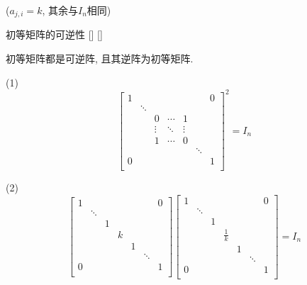 \documentclass[UTF8]{ctexart}
\begin{document}
\begin{ppt}
			($a_{j,i}=k$, 其余与$I_n$相同)
		\end{ppt}
		
		\begin{ppt}
			[]
			{初等矩阵的可逆性}
			[]
			[]

			初等矩阵都是可逆阵, 且其逆阵为初等矩阵. 
		\end{ppt}
  
		\begin{prf}	
			(1)$$\begin{bmatrix}
			1 & & & & & & 0\\
			 &\ddots & & & & & \\
			 & & 0 & \cdots & 1 & & \\
			 & &\vdots &\ddots &\vdots & & \\
			 & & 1 & \cdots & 0 & & \\
			 & & & & &\ddots & \\
			0 & & & & & & 1\\
			\end{bmatrix}^2=I_n$$
			
			(2)$$\begin{bmatrix}
			1 & & & & & & 0\\
			 &\ddots & & & & & \\
			 & & 1 & & & & \\
			 & & & k & & & \\
			 & & & & 1 & & \\
			 & & & & & \ddots & \\
			0 & & & & & & 1\\
			\end{bmatrix}
			\begin{bmatrix}
			1 & & & & & & 0\\
			 &\ddots & & & & & \\
			 & & 1 & & & & \\
			 & & & \frac{1}{k} & & & \\
			 & & & & 1 & & \\
			 & & & & & \ddots & \\
			0 & & & & & & 1\\
			\end{bmatrix}=I_n$$
			

\end{prf}
\end{document}
